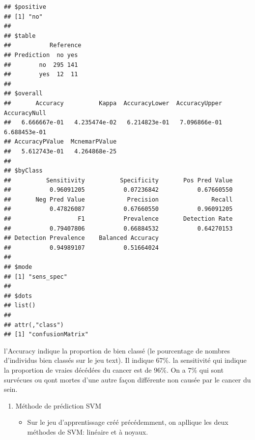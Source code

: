 \documentclass[
  12pt,
]{article}
\providecommand{\tightlist}{%
  \setlength{\itemsep}{0pt}\setlength{\parskip}{0pt}}
\begin{document}
\begin{verbatim}
## $positive
## [1] "no"
## 
## $table
##           Reference
## Prediction  no yes
##        no  295 141
##        yes  12  11
## 
## $overall
##       Accuracy          Kappa  AccuracyLower  AccuracyUpper   AccuracyNull 
##   6.666667e-01   4.235474e-02   6.214823e-01   7.096866e-01   6.688453e-01 
## AccuracyPValue  McnemarPValue 
##   5.612743e-01   4.264868e-25 
## 
## $byClass
##          Sensitivity          Specificity       Pos Pred Value 
##           0.96091205           0.07236842           0.67660550 
##       Neg Pred Value            Precision               Recall 
##           0.47826087           0.67660550           0.96091205 
##                   F1           Prevalence       Detection Rate 
##           0.79407806           0.66884532           0.64270153 
## Detection Prevalence    Balanced Accuracy 
##           0.94989107           0.51664024 
## 
## $mode
## [1] "sens_spec"
## 
## $dots
## list()
## 
## attr(,"class")
## [1] "confusionMatrix"
\end{verbatim}

l'Accuracy indique la proportion de bien classé (le pourcentage de
nombres d'individus bien classés sur le jeu text). Il indique 67\%. la
sensitivité qui indique la proportion de vraies décédées du cancer est
de 96\%. On a 7\% qui sont survécues ou qont mortes d'une autre façon
différente non causée par le cancer du sein.

\begin{enumerate}
\def\labelenumi{\arabic{enumi}.}
\setcounter{enumi}{1}
\item
  Méthode de prédiction SVM

  \begin{itemize}
  \tightlist
  \item
    Sur le jeu d'apprentissage créé précédemment, on apllique les deux
    méthodes de SVM: linéaire et à noyaux.
  \end{itemize}
\end{enumerate}
\end{document}
